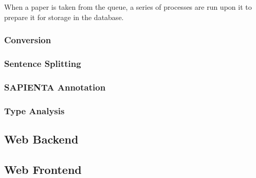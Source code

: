 When a paper is taken from the queue, a series of processes are run upon it to prepare 
it for storage in the database. 

\subsubsection{Conversion}

\subsubsection{Sentence Splitting}

\subsubsection{SAPIENTA Annotation}

\subsubsection{Type Analysis}


\subsection{ Web Backend }

\subsection{ Web Frontend }
